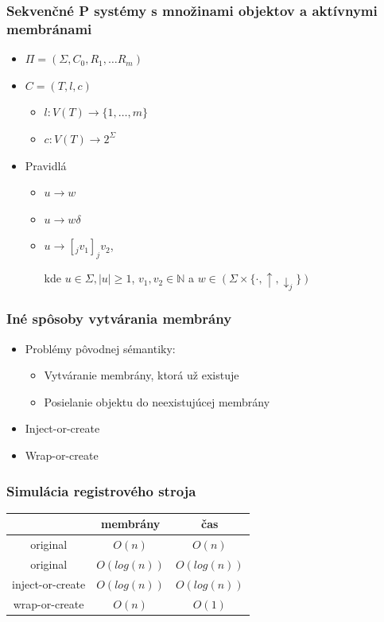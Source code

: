 \begin{frame}[t]\frametitle{Sekvenčné P systémy s množinami objektov a aktívnymi membránami}
  \begin{itemize}
    \item $\Pi = (\Sigma, C_0, R_1, \ldots R_m)$
    \pause
    \item $C = (T, l, c)$
    \begin{itemize}
      \item $l: V(T) \rightarrow \{1, \ldots, m\}$
      \item $c: V(T) \rightarrow 2^\Sigma$
    \end{itemize}
    \pause
    \item Pravidlá
    \begin{itemize}
      \item $u\rightarrow w$
      \item $u\rightarrow w\delta$
      \item $u\rightarrow [_j v_1]_j v_2$,

      kde $u \in \Sigma, |u|\geq 1$, $v_1,v_2\in \mathbb{N}$ a $w\in (\Sigma\times\{\cdot, \uparrow, \downarrow_{j}\})$
    \end{itemize}

  \end{itemize}
\end{frame}
\note{}

\begin{frame}[t]\frametitle{Iné spôsoby vytvárania membrány}
  \begin{itemize}
    \item Problémy pôvodnej sémantiky:
    \begin{itemize}
      \item Vytváranie membrány, ktorá už existuje
      \item Posielanie objektu do neexistujúcej membrány
    \end{itemize}
    \pause
    \item Inject-or-create
    \pause
    \item Wrap-or-create
  \end{itemize}
\end{frame}

\begin{frame}[t]\frametitle{Simulácia registrového stroja}
  \begin{center}
    \begin{tabular}{c|c|c}
      \hline
      & membrány & čas \\ \hline
      original & $O(n)$ & $O(n)$ \\ \hline
      \pause
      original & $O(log(n))$ & $O(log(n))$ \\ \hline
      \pause
      inject-or-create & $O(log(n))$ & $O(log(n))$ \\ \hline
      \pause
      wrap-or-create & $O(n)$ & $O(1)$ \\ \hline
    \end{tabular}
  \end{center}
\end{frame}

